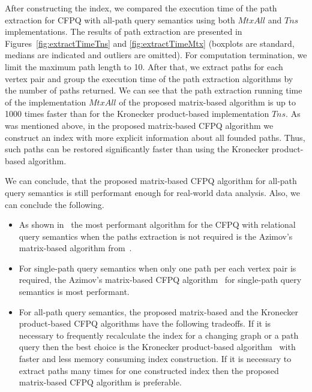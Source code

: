 After constructing the index, we compared the execution time of the path extraction for CFPQ with all-path query semantics using both $MtxAll$ and $Tns$ implementations. The results of path extraction are presented in Figures~\ref{fig:extractTimeTns} and \ref{fig:extractTimeMtx} (boxplots are standard, medians are indicated and outliers are omitted). For computation termination, we limit the maximum path length to 10. After that, we extract paths for each vertex pair and group the execution time of the path extraction algorithms by the number of paths returned. We can see that the path extraction running time of the implementation $MtxAll$ of the proposed matrix-based algorithm is up to 1000 times faster than for the Kronecker product-based implementation $Tns$. As was mentioned above, in the proposed matrix-based CFPQ algorithm we construct an index with more explicit information about all founded paths. Thus, such paths can be restored significantly faster than using the Kronecker product-based algorithm.

We can conclude, that the proposed matrix-based CFPQ algorithm for all-path query semantics is still performant enough for real-world data analysis. Also, we can conclude the following.

\begin{itemize}
	\item As shown in~\cite{10.1145/3398682.3399163, kron} the most performant algorithm for the CFPQ with relational query semantics when the paths extraction is not required is the Azimov's matrix-based algorithm from~\cite{Azimov:2018:CPQ:3210259.3210264}.
	\item For single-path query semantics when only one path per each vertex pair is required, the Azimov's matrix-based CFPQ algorithm~\cite{10.1145/3398682.3399163} for single-path query semantics is most performant.
	\item For all-path query semantics, the proposed matrix-based and the Kronecker product-based CFPQ algorithms have the following tradeoffs. If it is necessary to frequently recalculate the index for a changing graph or a path query then the best choice is the Kronecker product-based algorithm~\cite{kron} with faster and less memory consuming index construction. If it is necessary to extract paths many times for one constructed index then the proposed matrix-based CFPQ algorithm is preferable.
\end{itemize}

